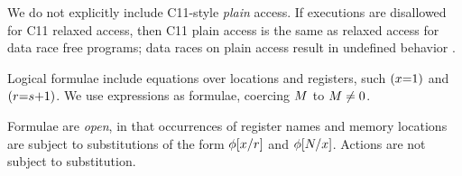 We do not explicitly include C11-style \emph{plain} access.  If \oota{}
executions are disallowed for C11 relaxed access, then C11 plain access
is the same as relaxed access for data race free programs; data races on
plain access result in undefined behavior \cite{undefined}.
\begin{comment}
  Thin air example from referee: if (x) y := 1 || if (y) x := 1 .
\end{comment}




Logical formulae include equations over locations and registers, such
$(x{=}1)$ and $(r{=}s{+}1)$.
We use expressions as formulae, coercing $M$ to $M\neq 0$.

Formulae are \emph{open}, in that
occurrences of register names and memory locations are subject to
substitutions of the form $\phi[x/r]$ and $\phi[N/x]$.
Actions are not subject to substitution.


